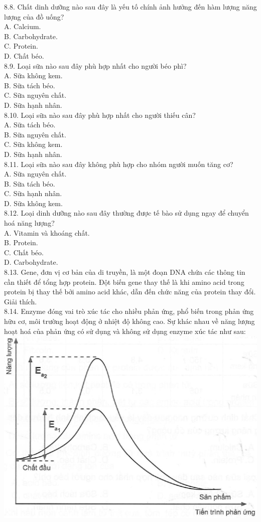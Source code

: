 \documentclass[10pt]{article}
\begin{document}
8.8. Chất dinh dưỡng nào sau đây là yếu tố chính ảnh hưởng đến hàm lượng năng lượng của đồ uống?\\
A. Calcium.\\
B. Carbohydrate.\\
C. Protein.\\
D. Chất béo.\\
8.9. Loại sữa nào sau đây phù hợp nhất cho người béo phì?\\
A. Sữa không kem.\\
B. Sữa tách béo.\\
C. Sữa nguyên chất.\\
D. Sữa hạnh nhân.\\
8.10. Loại sữa nào sau đây phù hợp nhất cho người thiếu cân?\\
A. Sữa tách béo.\\
B. Sữa nguyên chất.\\
C. Sữa không kem.\\
D. Sữa hạnh nhân.\\
8.11. Loại sữa nào sau đây không phù hợp cho nhóm người muốn tăng cơ?\\
A. Sữa nguyên chất.\\
B. Sữa tách béo.\\
C. Sữa hạnh nhân.\\
D. Sữa không kem.\\
8.12. Loại dinh dưỡng nào sau đây thường được tế bào sử dụng ngay để chuyển hoá năng lượng?\\
A. Vitamin và khoáng chất.\\
B. Protein.\\
C. Chất béo.\\
D. Carbohydrate.\\
8.13. Gene, đơn vị cơ bản của di truyền, là một đoạn DNA chứa các thông tin cần thiết để tổng hợp protein. Đột biến gene thay thế là khi amino acid trong protein bị thay thế bởi amino acid khác, dẫn đến chức năng của protein thay đổi. Giải thích.\\
8.14. Enzyme đóng vai trò xúc tác cho nhiều phản ứng, phổ biến trong phản ứng hữu cơ, môi trường hoạt động ở nhiệt độ không cao. Sự khác nhau về năng lượng hoạt hoá của phản ứng có sử dụng và không sử dụng enzyme xúc tác như sau:\\
\includegraphics[max width=\textwidth, center]{2025_10_23_de6f5713836e4e91b3c8g-058}
\end{document}
